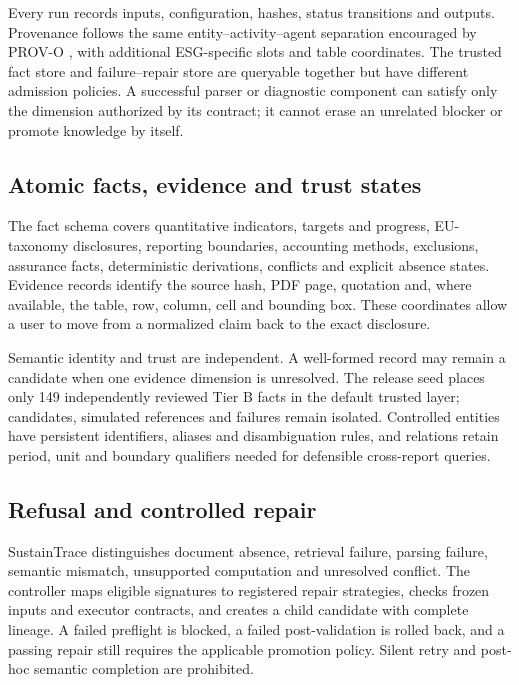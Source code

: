 \documentclass[a4paper,fleqn]{cas-sc}
\begin{document}
Every run records inputs, configuration, hashes, status transitions and outputs. Provenance follows
the same entity--activity--agent separation encouraged by PROV-O \citep{w3cprov2013}, with
additional ESG-specific slots and table coordinates. The trusted fact store and failure--repair
store are queryable together but have different admission policies. A successful parser or
diagnostic component can satisfy only the dimension authorized by its contract; it cannot erase an
unrelated blocker or promote knowledge by itself.

\subsection{Atomic facts, evidence and trust states}

The fact schema covers quantitative indicators, targets and progress, EU-taxonomy disclosures,
reporting boundaries, accounting methods, exclusions, assurance facts, deterministic derivations,
conflicts and explicit absence states. Evidence records identify the source hash, PDF page,
quotation and, where available, the table, row, column, cell and bounding box. These coordinates
allow a user to move from a normalized claim back to the exact disclosure.

Semantic identity and trust are independent. A well-formed record may remain a candidate when one
evidence dimension is unresolved. The release seed places only 149 independently reviewed Tier B
facts in the default trusted layer; candidates, simulated references and failures remain isolated.
Controlled entities have persistent identifiers, aliases and disambiguation rules, and relations
retain period, unit and boundary qualifiers needed for defensible cross-report queries.

\subsection{Refusal and controlled repair}

SustainTrace distinguishes document absence, retrieval failure, parsing failure, semantic mismatch,
unsupported computation and unresolved conflict. The controller maps eligible signatures to
registered repair strategies, checks frozen inputs and executor contracts, and creates a child
candidate with complete lineage. A failed preflight is blocked, a failed post-validation is rolled
back, and a passing repair still requires the applicable promotion policy. Silent retry and
post-hoc semantic completion are prohibited.
\end{document}
